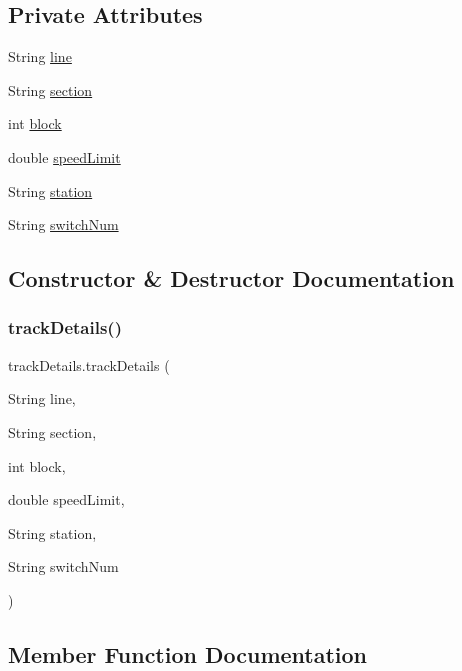 \subsection*{Private Attributes}
\begin{DoxyCompactItemize}
\item 
String \hyperlink{classtrackDetails_a8b79c0cfb50c7468da12fa27136ad405}{line}
\item 
String \hyperlink{classtrackDetails_ab792824f4e3b7a384dd6edd2477a71e4}{section}
\item 
int \hyperlink{classtrackDetails_a13669b99469f4b78df534fbb72f4143d}{block}
\item 
double \hyperlink{classtrackDetails_a1d5bd79ee0bb744bec31e83a3d2895dd}{speed\+Limit}
\item 
String \hyperlink{classtrackDetails_ac7e67717763b308bcab1b1103f9aa1f7}{station}
\item 
String \hyperlink{classtrackDetails_a505f97a602c160591e64664790ca4e5b}{switch\+Num}
\end{DoxyCompactItemize}


\subsection{Constructor \& Destructor Documentation}
\mbox{\label{classtrackDetails_a3cae5dfd3207dce4756ce2f0353a5763}} 
\subsubsection{\texorpdfstring{track\+Details()}{trackDetails()}}
{\footnotesize\ttfamily track\+Details.\+track\+Details (\begin{DoxyParamCaption}\item[{String}]{line,  }\item[{String}]{section,  }\item[{int}]{block,  }\item[{double}]{speed\+Limit,  }\item[{String}]{station,  }\item[{String}]{switch\+Num }\end{DoxyParamCaption})}



\subsection{Member Function Documentation}
\mbox{\label{classtrackDetails_ace170128a164913c83f3cba25dda135f}} 
